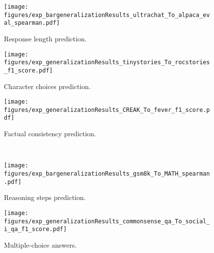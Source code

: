     

\begin{figure*}[tb!] 
    \centering
    \renewcommand{\thesubfigure}{\alph{mycounter}}  %
    \setcounter{mycounter}{1}
    \begin{subfigure}[b]{0.32\linewidth}
        \centering
        \texttt{[image: figures/exp\_bargeneralizationResults\_ultrachat\_To\_alpaca\_eval\_spearman.pdf]}
        \vspace{-15pt}
        \caption{Response length prediction.}
        \label{fig:exp_bar_response_length_crossDataset}
    \end{subfigure}
    \hfill
    \setcounter{mycounter}{3}
    \begin{subfigure}[b]{0.32\linewidth}
        \centering
        \texttt{[image: figures/exp\_generalizationResults\_tinystories\_To\_rocstories\_f1\_score.pdf]}
        \vspace{-15pt}
        \caption{Character choices prediction.}
        \label{fig:exp_character_choices_crossDataset}
    \end{subfigure}
    \hfill  %
    \setcounter{mycounter}{5}
    \begin{subfigure}[b]{0.32\linewidth}
        \centering
        \texttt{[image: figures/exp\_generalizationResults\_CREAK\_To\_fever\_f1\_score.pdf]}
        \vspace{-15pt}
        \caption{Factual consistency prediction.}
        \label{fig:exp_factual_consistency_crossDataset}
    \end{subfigure}
    \\
    \setcounter{mycounter}{2}
    \begin{subfigure}[b]{0.32\linewidth}
        \centering
        \texttt{[image: figures/exp\_bargeneralizationResults\_gsm8k\_To\_MATH\_spearman.pdf]}
        \vspace{-15pt}
        \caption{Reasoning steps prediction.}
        \label{fig:exp_bar_reasoning_steps_crossDataset}
    \end{subfigure}
    \hfill
    \setcounter{mycounter}{4}
    \begin{subfigure}[b]{0.32\linewidth}
        \centering
        \texttt{[image: figures/exp\_generalizationResults\_commonsense\_qa\_To\_social\_i\_qa\_f1\_score.pdf]}
        \vspace{-15pt}
        \caption{Multiple-choice answers.}
        \label{fig:exp_multiplechoice_answers_crossDataset}

\end{subfigure}
\end{figure*}
